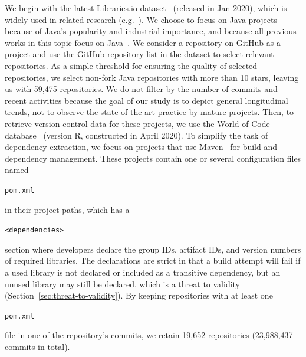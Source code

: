 \documentclass[sigconf, screen]{acmart}
\newcommand{\Code}[1]{\begin{small}\texttt{#1}\end{small}}
\begin{document}
We begin with the latest Libraries.io dataset~\cite{LibrariesIO} (released in Jan 2020), which is widely used in related research (e.g.~\cite{zerouali2018empirical, decan2019empirical, he2021multi, alfadel2021empirical}).
We choose to focus on Java projects because of Java's popularity and industrial importance, and because all previous works in this topic focus on Java~\cite{teyton2012mining, teyton2014study, kabinna2016logging}. %
We consider a repository on GitHub as a project and use the GitHub repository list in the dataset to select relevant repositories.
As a simple threshold for ensuring the quality of selected repositories, we select non-fork Java repositories with more than 10 stars, leaving us with 59,475 repositories.
We do not filter by the number of commits and recent activities %
because the goal of our study is to depict general longitudinal trends, not to observe the state-of-the-art practice by mature projects.
Then, to retrieve version control data for these projects, we use the World of Code database~\cite{ma2019world} (version R, constructed in April 2020). 
To simplify the task of dependency extraction, we focus on projects that use Maven~\cite{MavenTool} for build and dependency management.
These projects contain one or several configuration files named \Code{pom.xml} in their project paths, which has a \Code{<dependencies>} section where developers declare the group IDs, artifact IDs, and version numbers of required libraries.
The declarations are strict in that a build attempt will fail if a used library is not declared or included as a transitive dependency, but an unused library may still be declared, which is a threat to validity (Section~\ref{sec:threat-to-validity}).
By keeping repositories with at least one \Code{pom.xml} file in one of the repository's commits, we retain 19,652 repositories (23,988,437 commits in total).
\end{document}
